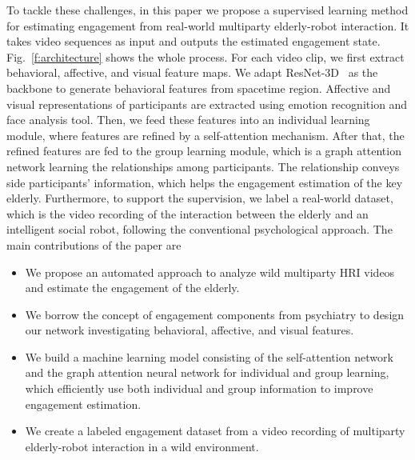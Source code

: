 \documentclass[twocolumn]{svjour3}
\begin{document}
To tackle these challenges, in this paper we propose a supervised learning method for estimating engagement from real-world multiparty elderly-robot interaction. It takes video sequences as input and outputs the estimated engagement state. Fig.~\ref{f:architecture} shows the whole process. For each video clip, we first extract  behavioral, affective, and visual feature maps. We adapt ResNet-3D~\cite{Hara2018Can} as the backbone to generate behavioral features from spacetime region. Affective and visual representations of participants are extracted using emotion recognition and face analysis tool. Then, we feed these features into an individual learning module, where features are refined by a self-attention mechanism. After that, the refined features are fed to the group learning module, which is a graph attention network learning the relationships among participants. The relationship conveys side participants' information, which helps the engagement estimation of the key elderly. Furthermore, to support the supervision, we label a real-world dataset, which is the video recording of the interaction between the elderly and an intelligent social robot, following the conventional psychological approach. The main contributions of the paper are
\begin{itemize}
\item We propose an automated approach to analyze wild multiparty HRI videos and estimate the engagement of the elderly.
\item We borrow the concept of engagement components from psychiatry to design our network investigating behavioral, affective, and visual features.
\item We build a machine learning model consisting of the self-attention network and the graph attention neural network for individual and group learning, which efficiently use both individual and group information to  improve engagement estimation.
\item We create a labeled engagement dataset from a video recording of multiparty elderly-robot interaction in a wild environment.
\end{itemize}


\end{document}
